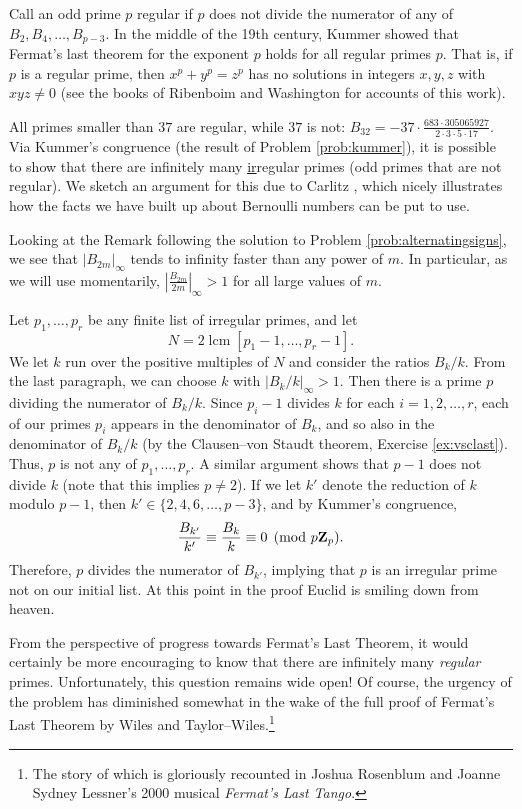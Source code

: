 \begin{rmk} Call an odd prime $p$ \textsf{regular} if $p$ does not divide the numerator of any of $B_2, B_4, \dots, B_{p-3}$. In the middle of the 19th century, Kummer showed that Fermat's last theorem for the exponent $p$ holds for all regular primes $p$. That is, if $p$ is a regular prime, then $x^p+y^p=z^p$ has no solutions in integers $x,y,z$ with $xyz\ne 0$ (see the books of Ribenboim \cite{ribenboim} and Washington \cite{washington} for accounts of this work).

All primes smaller than $37$ are regular, while $37$ is not: $B_{32} = -37 \cdot \frac{683 \cdot 305065927}{2\cdot 3\cdot 5 \cdot 17}$. Via Kummer's congruence (the result of Problem \ref{prob:kummer}), it is possible to show that there are infinitely many \underline{ir}regular primes (odd primes that are not regular). We sketch an argument for this due to Carlitz \cite{carlitz}, which nicely illustrates how the facts we have built up about Bernoulli numbers can be put to use. 

Looking at the Remark following the solution to Problem \ref{prob:alternatingsigns}, we see that $|B_{2m}|_{\infty}$ tends to infinity faster than any power of $m$. In particular, as we will use momentarily, $|\frac{B_{2m}}{2m}|_{\infty} > 1$ for all large values of $m$.

Let $p_1,\dots,p_r$ be any finite list of irregular primes, and let $$N = 2\mathop{\mathrm{lcm}}[p_1-1,\dots,p_r-1].$$ We let $k$ run over the positive multiples of $N$ and consider the ratios $B_{k}/k$. From the last paragraph, we can choose $k$ with $|B_k/k|_{\infty} > 1$. Then there is a prime $p$ dividing the numerator of $B_k/k$. Since $p_i-1$ divides $k$ for each $i=1,2,\dots, r$, each of our primes $p_i$ appears in the denominator of $B_k$, and so also in the denominator of $B_k/k$ (by the Clausen--von Staudt theorem, Exercise \ref{ex:vsclast}). Thus, $p$ is not any of $p_1,\dots,p_r$. A similar argument shows that $p-1$ does not divide $k$ (note that this implies $p\ne 2$). If we let $k'$ denote the reduction of $k$ modulo $p-1$, then $k' \in \{2, 4, 6, \dots, p-3\}$, and by Kummer's congruence, 
\[ \frac{B_{k'}}{k'} \equiv \frac{B_k}{k} \equiv 0 \pmod{p\mathbf{Z}_p}. \] 
Therefore, $p$ divides the numerator of $B_{k'}$, implying that $p$ is an irregular prime not on our initial list. At this point in the proof Euclid is smiling down from heaven.

From the perspective of progress towards Fermat's Last Theorem, it would certainly be more encouraging to know that there are infinitely many \emph{regular} primes. Unfortunately, this question remains wide open! Of course, the urgency of the problem has diminished somewhat in the wake of the full proof of Fermat's Last Theorem by Wiles and Taylor--Wiles.\footnote{The story of which is gloriously recounted in  Joshua Rosenblum and Joanne Sydney Lessner's 2000 musical \emph{Fermat's Last Tango}.}
\end{rmk}

